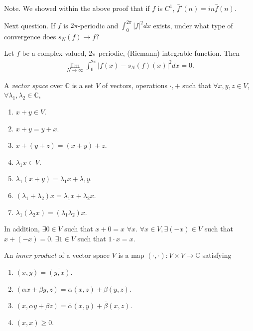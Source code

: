 \documentclass[11pt]{article}
\begin{document}
Note. We showed within the above proof that if $f$ is $C^1$, $\hat{f}'(n) = in \hat{f}(n)$.

Next question. If $f$ is  $2\pi$-periodic and $\int_0^{2\pi} |f|^2 dx$ exists, under what type of convergence does $s_N(f) \to f$?

\begin{theorem} Let $f$ be a complex valued, $2 \pi$-periodic, (Riemann) integrable function. Then \begin{align*} \lim_{N \to \infty} \int_0^{2\pi} |f(x) - s_N (f)(x) |^2 dx = 0.
\end{align*}
\end{theorem}

\begin{definition} A \emph{vector space} over $\mathbb{C}$ is a set $V$ of vectors, operations $\cdot, +$ such that $\forall x, y, z \in V$, $\forall \lambda_1, \lambda_2 \in \mathbb{C}$,
  \begin{enumerate}
  \item $x + y \in V$.
  \item $x + y = y + x$.
  \item $x + (y + z) = (x + y) + z$.
  \item $\lambda_1 x \in V$.
  \item $\lambda_1 (x + y) = \lambda_1 x + \lambda_1 y$.
  \item $(\lambda_1 + \lambda_2)x = \lambda_1 x + \lambda_2 x$.
  \item $\lambda_1(\lambda_2 x) = (\lambda_1 \lambda_2)x$.
  \end{enumerate}
  In addition, $\exists 0 \in V$ such that $x + 0 = x$ $\forall x$. $\forall x \in V, \exists (-x) \in V$ such that $x + (-x) = 0$. $\exists 1 \in V$ such that $1 \cdot x = x$.
\end{definition}

\begin{definition} An \emph{inner product} of a vector space $V$ is a map $(\cdot, \cdot): V \times V \to \mathbb{C}$ satisfying
  \begin{enumerate}
  \item $(x, y) = \overline{(y, x)}$.
  \item $(\alpha x + \beta y, z) = \alpha(x, z) + \beta(y, z)$.
  \item $(x, \alpha y + \beta z) = \overline{\alpha} (x, y) + \overline{\beta} (x, z)$.
  \item $(x, x) \ge 0$.
  \end{enumerate}
\end{definition}
\end{document}
